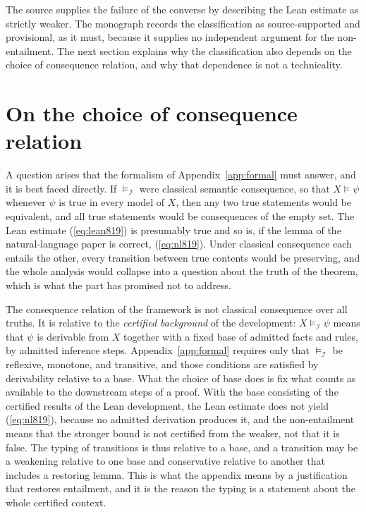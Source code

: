 The source supplies the failure of the converse by describing the Lean estimate as strictly weaker. The monograph records the classification as source-supported and provisional, as it must, because it supplies no independent argument for the non-entailment. The next section explains why the classification also depends on the choice of consequence relation, and why that dependence is not a technicality.

\section{On the choice of consequence relation}

A question arises that the formalism of Appendix~\ref{app:formal} must answer, and it is best faced directly. If $\models_{\mathcal{I}}$ were classical semantic consequence, so that $X \models \psi$ whenever $\psi$ is true in every model of $X$, then any two true statements would be equivalent, and all true statements would be consequences of the empty set. The Lean estimate (\ref{eq:lean819}) is presumably true and so is, if the lemma of the natural-language paper is correct, (\ref{eq:nl819}). Under classical consequence each entails the other, every transition between true contents would be preserving, and the whole analysis would collapse into a question about the truth of the theorem, which is what the part has promised not to address.

The consequence relation of the framework is not classical consequence over all truths. It is relative to the \emph{certified background} of the development: $X \models_{\mathcal{I}} \psi$ means that $\psi$ is derivable from $X$ together with a fixed base of admitted facts and rules, by admitted inference steps. Appendix~\ref{app:formal} requires only that $\models_{\mathcal{I}}$ be reflexive, monotone, and transitive, and those conditions are satisfied by derivability relative to a base. What the choice of base does is fix what counts as available to the downstream steps of a proof. With the base consisting of the certified results of the Lean development, the Lean estimate does not yield (\ref{eq:nl819}), because no admitted derivation produces it, and the non-entailment means that the stronger bound is not certified from the weaker, not that it is false. The typing of transitions is thus relative to a base, and a transition may be a weakening relative to one base and conservative relative to another that includes a restoring lemma. This is what the appendix means by a justification that restores entailment, and it is the reason the typing is a statement about the whole certified context.

